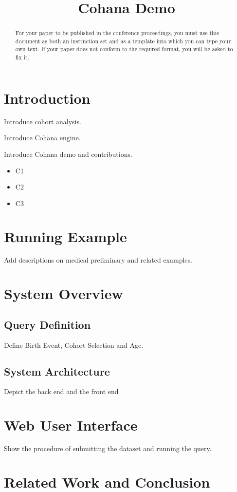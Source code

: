 \documentclass[10pt,conference,letterpaper]{IEEEtran}
\title{Cohana Demo}
\begin{document}
\maketitle
%
\begin{abstract} 
For your paper to be published in the conference proceedings, you must
use this document as both an instruction set and as a template into
which you can type your own text.  If your paper does not conform to
the required format, you will be asked to fix it.
\end{abstract}

%
\section{Introduction}
%
Introduce cohort analysis.

Introduce Cohana engine.

Introduce Cohana demo and contributions.

\begin{itemize}
\item	C1
\item   C2
\item   C3
\end{itemize}

\section{Running Example}

Add descriptions on medical preliminary and related examples.


\section{System Overview}

\subsection{Query Definition}

Define Birth Event, Cohort Selection and Age.

\subsection{System Architecture}

Depict the back end and the front end

\section{Web User Interface}

Show the procedure of submitting the dataset and running the query.

\section{Related Work and Conclusion}









\end{document}
